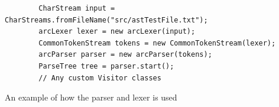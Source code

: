 \begin{listing}[htb!]
    \begin{verbatim}
        CharStream input = CharStreams.fromFileName("src/astTestFile.txt");
        arcLexer lexer = new arcLexer(input);
        CommonTokenStream tokens = new CommonTokenStream(lexer);
        arcParser parser = new arcParser(tokens);
        ParseTree tree = parser.start();
        // Any custom Visitor classes
    \end{verbatim}
    \caption{An example of how the parser and lexer is used}
    \label{lst:parserandlexerexample}
\end{listing}


